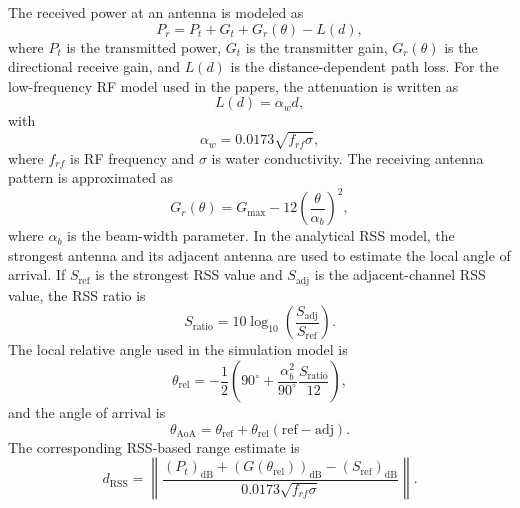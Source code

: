 \documentclass{uhcoethesis}
\begin{document}
The received power at an antenna is modeled as
\begin{equation}
    P_r = P_t + G_t + G_r(\theta) - L(d),
    \label{eq:ch5_received_power}
\end{equation}
where $P_t$ is the transmitted power, $G_t$ is the transmitter gain, $G_r(\theta)$ is the directional receive gain, and $L(d)$ is the distance-dependent path loss. For the low-frequency RF model used in the papers, the attenuation is written as
\begin{equation}
    L(d)=\alpha_w d,
    \label{eq:ch5_path_loss}
\end{equation}
with
\begin{equation}
    \alpha_w = 0.0173\sqrt{f_{rf}\sigma},
    \label{eq:ch5_water_attenuation}
\end{equation}
where $f_{rf}$ is RF frequency and $\sigma$ is water conductivity. The receiving antenna pattern is approximated as
\begin{equation}
    G_r(\theta)=G_{\max}-12\left(\frac{\theta}{\alpha_b}\right)^2,
    \label{eq:ch5_directional_gain}
\end{equation}
where $\alpha_b$ is the beam-width parameter. In the analytical RSS model, the strongest antenna and its adjacent antenna are used to estimate the local angle of arrival. If $S_{\mathrm{ref}}$ is the strongest RSS value and $S_{\mathrm{adj}}$ is the adjacent-channel RSS value, the RSS ratio is
\begin{equation}
    S_{\mathrm{ratio}} = 10\log_{10}\left(\frac{S_{\mathrm{adj}}}{S_{\mathrm{ref}}}\right).
    \label{eq:ch5_rss_ratio}
\end{equation}
The local relative angle used in the simulation model is
\begin{equation}
    \theta_{\mathrm{rel}} =
    -\frac{1}{2}
    \left(
        90^\circ + \frac{\alpha_b^2}{90^\circ}\frac{S_{\mathrm{ratio}}}{12}
    \right),
    \label{eq:ch5_theta_rel}
\end{equation}
and the angle of arrival is
\begin{equation}
    \theta_{\mathrm{AoA}}=\theta_{\mathrm{ref}}+\theta_{\mathrm{rel}}(\mathrm{ref}-\mathrm{adj}).
    \label{eq:ch5_aoa}
\end{equation}
The corresponding RSS-based range estimate is
\begin{equation}
    d_{\mathrm{RSS}} =
    \left\lVert
    \frac{(P_t)_{\mathrm{dB}} + (G(\theta_{\mathrm{rel}}))_{\mathrm{dB}} - (S_{\mathrm{ref}})_{\mathrm{dB}}}
    {0.0173\sqrt{f_{rf}\sigma}}
    \right\rVert.
    \label{eq:ch5_rss_distance}
\end{equation}
\end{document}
